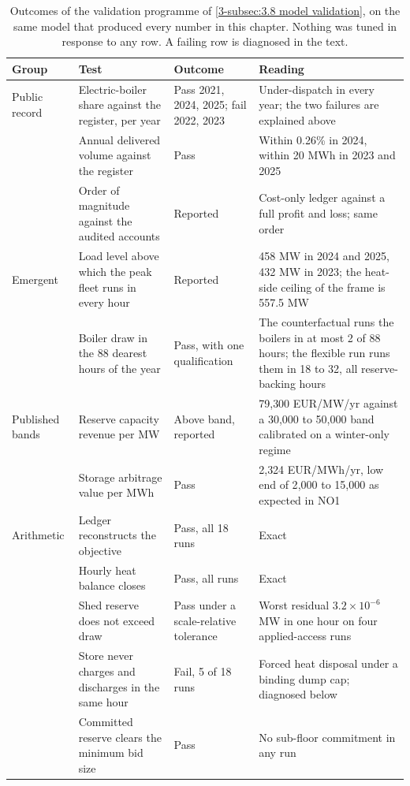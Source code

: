 \begin{table}[htbp]
\centering
\caption{Outcomes of the validation programme of \autoref{3-subsec:3.8 model validation}, on the same model that produced every number in this chapter. Nothing was tuned in response to any row. A failing row is diagnosed in the text.}
\footnotesize
\begin{tabular}{p{1.9cm} p{5.5cm} p{1.6cm} p{4.6cm}}
\toprule
\textbf{Group} & \textbf{Test} & \textbf{Outcome} & \textbf{Reading} \\
\midrule
Public record & Electric-boiler share against the register, per year & Pass 2021, 2024, 2025; fail 2022, 2023 & Under-dispatch in every year; the two failures are explained above \\
 & Annual delivered volume against the register & Pass & Within 0.26\% in 2024, within 20 MWh in 2023 and 2025 \\
 & Order of magnitude against the audited accounts & Reported & Cost-only ledger against a full profit and loss; same order \\
\addlinespace
Emergent & Load level above which the peak fleet runs in every hour & Reported & 458 MW in 2024 and 2025, 432 MW in 2023; the heat-side ceiling of the frame is 557.5 MW \\
 & Boiler draw in the 88 dearest hours of the year & Pass, with one qualification & The counterfactual runs the boilers in at most 2 of 88 hours; the flexible run runs them in 18 to 32, all reserve-backing hours \\
\addlinespace
Published bands & Reserve capacity revenue per MW & Above band, reported & 79{,}300 EUR/MW/yr against a 30{,}000 to 50{,}000 band calibrated on a winter-only regime \\
 & Storage arbitrage value per MWh & Pass & 2{,}324 EUR/MWh/yr, low end of 2{,}000 to 15{,}000 as expected in NO1 \\
\addlinespace
Arithmetic & Ledger reconstructs the objective & Pass, all 18 runs & Exact \\
 & Hourly heat balance closes & Pass, all runs & Exact \\
 & Shed reserve does not exceed draw & Pass under a scale-relative tolerance & Worst residual $3.2 \times 10^{-6}$ MW in one hour on four applied-access runs \\
 & Store never charges and discharges in the same hour & Fail, 5 of 18 runs & Forced heat disposal under a binding dump cap; diagnosed below \\
 & Committed reserve clears the minimum bid size & Pass & No sub-floor commitment in any run \\

\end{tabular}
\end{table}
